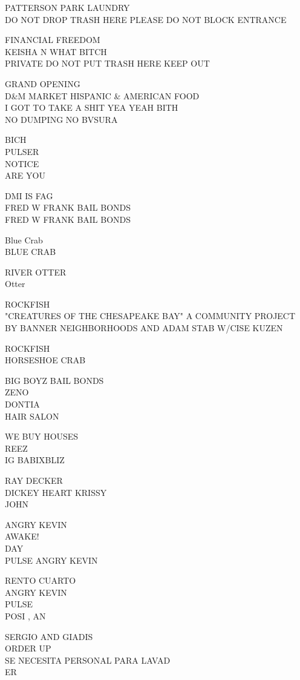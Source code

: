\documentclass[10pt,letterpaper]{article}
\begin{document}
PATTERSON PARK LAUNDRY\\
DO NOT DROP TRASH HERE PLEASE DO NOT BLOCK ENTRANCE

FINANCIAL FREEDOM\\
KEISHA N WHAT BITCH\\
PRIVATE DO NOT PUT TRASH HERE KEEP OUT

GRAND OPENING\\
D\&M MARKET HISPANIC \& AMERICAN FOOD\\
I GOT TO TAKE A SHIT YEA YEAH BITH\\
NO DUMPING NO BVSURA

BICH\\
PULSER\\
NOTICE\\
ARE YOU

DMI IS FAG\\
FRED W FRANK BAIL BONDS\\
FRED W FRANK BAIL BONDS

Blue Crab\\
BLUE CRAB

RIVER OTTER\\
Otter

ROCKFISH\\
"CREATURES OF THE CHESAPEAKE BAY" A COMMUNITY PROJECT BY BANNER NEIGHBORHOODS AND ADAM STAB W/CISE KUZEN

ROCKFISH\\
HORSESHOE CRAB

BIG BOYZ BAIL BONDS\\
ZENO\\
DONTIA\\
HAIR SALON

WE BUY HOUSES\\
REEZ\\
IG BABIXBLIZ

RAY DECKER\\
DICKEY HEART KRISSY\\
JOHN

ANGRY KEVIN\\
AWAKE!\\
DAY\\
PULSE ANGRY KEVIN

RENTO CUARTO\\
ANGRY KEVIN\\
PULSE\\
POSI , AN

SERGIO AND GIADIS\\
ORDER UP\\
SE NECESITA PERSONAL PARA LAVAD\\
ER
\end{document}

